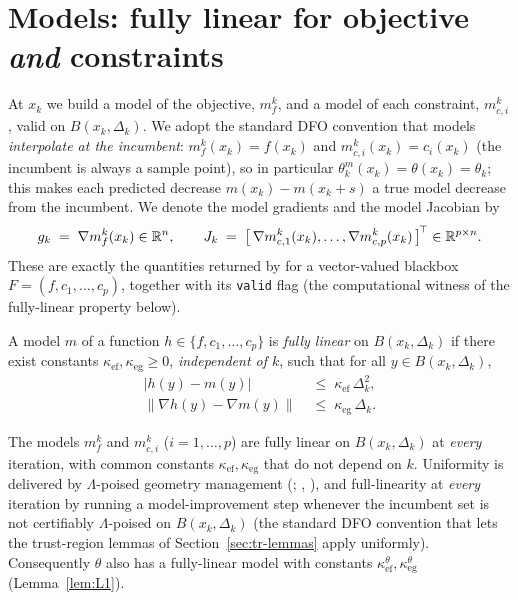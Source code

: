 \section{Models: fully linear for objective \emph{and} constraints}
\label{sec:models}

At $x_k$ we build a model of the objective, $m_f^k$, and a model of each
constraint, $m_{c,i}^k$, valid on $B(x_k,\Delta_k)$. We adopt the standard DFO
convention that models \emph{interpolate at the incumbent}: $m_f^k(x_k)=f(x_k)$ and
$m_{c,i}^k(x_k)=c_i(x_k)$ (the incumbent is always a sample point), so in particular
$\theta_k^m(x_k)=\theta(x_k)=\theta_k$; this makes each predicted decrease
$m(x_k)-m(x_k+s)$ a true model decrease from the incumbent. We denote the model
gradients and the model Jacobian by
\[
  g_k \;=\; \nabla m_f^k(x_k)\in\mathbb{R}^{n},
  \qquad
  J_k \;=\; \bigl[\,\nabla m_{c,1}^k(x_k),\dots,\nabla m_{c,p}^k(x_k)\,\bigr]^{\!\top}\in\mathbb{R}^{p\times n}.
\]
These are exactly the quantities returned by  for a
vector-valued blackbox $F=(f,c_1,\dots,c_p)$, together with its \verb|valid| flag
(the computational witness of the fully-linear property below).

\begin{definition}
  \label{def:fl}
  A model $m$ of a function $h\in\{f,c_1,\dots,c_p\}$ is \emph{fully linear} on
  $B(x_k,\Delta_k)$ if there exist constants $\kappa_{\mathrm{ef}},
  \kappa_{\mathrm{eg}}\ge 0$, \emph{independent of $k$}, such that for all
  $y\in B(x_k,\Delta_k)$,
  \begin{align}
    \bigl|h(y)-m(y)\bigr|            &\;\le\; \kappa_{\mathrm{ef}}\,\Delta_k^2,
    \label{eq:fl-value}\\
    \bigl\|\nabla h(y)-\nabla m(y)\bigr\| &\;\le\; \kappa_{\mathrm{eg}}\,\Delta_k.
    \label{eq:fl-grad}
  \end{align}
\end{definition}

\begin{assumption}
  \label{ass:fl}
  The models $m_f^k$ and $m_{c,i}^k$ ($i=1,\dots,p$) are fully linear on
  $B(x_k,\Delta_k)$ at \emph{every} iteration, with common constants
  $\kappa_{\mathrm{ef}},\kappa_{\mathrm{eg}}$ that do not depend on $k$. Uniformity
  is delivered by $\Lambda$-poised geometry management (\citealp[Ch.~6]{CSV2009};
  , ), and full-linearity at
  \emph{every} iteration by running a model-improvement step whenever the incumbent
  set is not certifiably $\Lambda$-poised on $B(x_k,\Delta_k)$ (the standard DFO
  convention that lets the trust-region lemmas of Section~\ref{sec:tr-lemmas} apply
  uniformly). Consequently $\theta$ also has a fully-linear model with constants
  $\kappa_{\mathrm{ef}}^\theta,\kappa_{\mathrm{eg}}^\theta$ (Lemma~\ref{lem:L1}).
\end{assumption}

